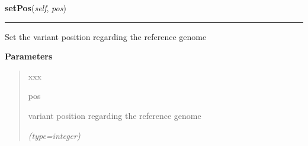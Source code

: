     \label{script-FixedVar:var:setPos}

    \vspace{0.5ex}

\hspace{.8\funcindent}\begin{boxedminipage}{\funcwidth}

    \raggedright \textbf{setPos}(\textit{self}, \textit{pos})

    \vspace{-1.5ex}

    \rule{\textwidth}{0.5\fboxrule}
\setlength{\parskip}{2ex}
    Set the variant position regarding the reference genome

\setlength{\parskip}{1ex}
      \textbf{Parameters}
      \vspace{-1ex}

      \begin{quote}
        \begin{Ventry}{xxx}

          \item[pos]

          variant position regarding the reference genome

            {\it (type=integer)}

        \end{Ventry}

      \end{quote}

    \end{boxedminipage}

    \label{script-FixedVar:var:setVar}

    \vspace{0.5ex}

